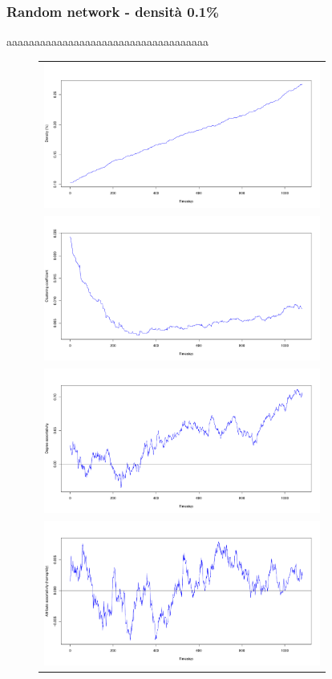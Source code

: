 \documentclass[a4paper,12pt]{article}
\begin{document}
\subsubsection{Random network - densità 0.1\%}
aaaaaaaaaaaaaaaaaaaaaaaaaaaaaaaaaaaa
\begin{figure}[h]
\begin{tabular}{c}
  \includegraphics[width=91mm]{images/evolution_1000_rnd_1080_01_0.pdf} \\   \includegraphics[width=91mm]{images/clustering_1000_rnd_1080_01_0.pdf} \\
 \includegraphics[width=91mm]{images/deg_assortativity_1000_rnd_1080_01_0.pdf} \\   \includegraphics[width=91mm]{images/homophily_1000_rnd_1080_01_0.pdf} \\
\end{tabular}
\centering
\end{figure}
\newpage
\end{document}
